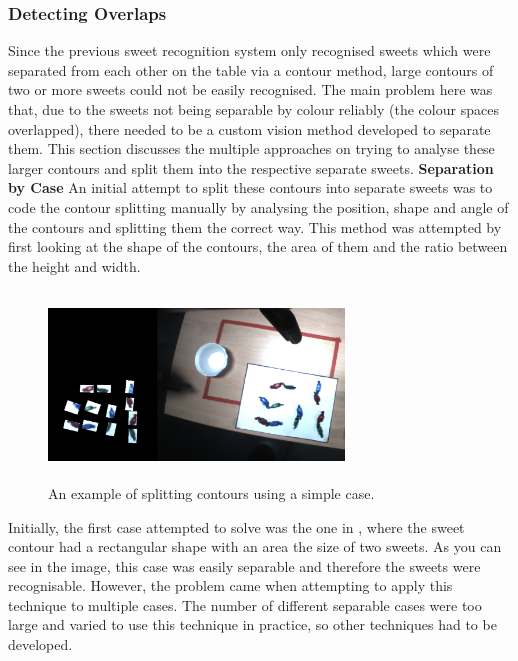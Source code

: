 \subsubsection{Detecting Overlaps}
Since the previous sweet recognition system only recognised sweets which were separated from each other on the table via a contour method, large contours of two or more sweets could not be easily recognised. The main problem here was that, due to the sweets not being separable by colour reliably (the colour spaces overlapped), there needed to be a custom vision method developed to separate them. This section discusses the multiple approaches on trying to analyse these larger contours and split them into the respective separate sweets.
\newline\newline
\textbf{Separation by Case}\newline
An initial attempt to split these contours into separate sweets was to code the contour splitting manually by analysing the position, shape and angle of the contours and splitting them the correct way. This method was attempted by first looking at the shape of the contours, the area of them and the ratio between the height and width. 
\captionsetup[figure]{justification=centering}
\begin{figure}[H]
        \centering 
        \includegraphics[width=0.7\textwidth, height=5cm]{halvingcollisions.png}
        \caption{An example of splitting contours using a simple case.}
        \label{fig:separatecase}
\end{figure}
Initially, the first case attempted to solve was the one in \textbf{}, where the sweet contour had a rectangular shape with an area the size of two sweets. As you can see in the image, this case was easily separable and therefore the sweets were recognisable. However, the problem came when attempting to apply this technique to multiple cases. The number of different separable cases were too large and varied to use this technique in practice, so other techniques had to be developed.
